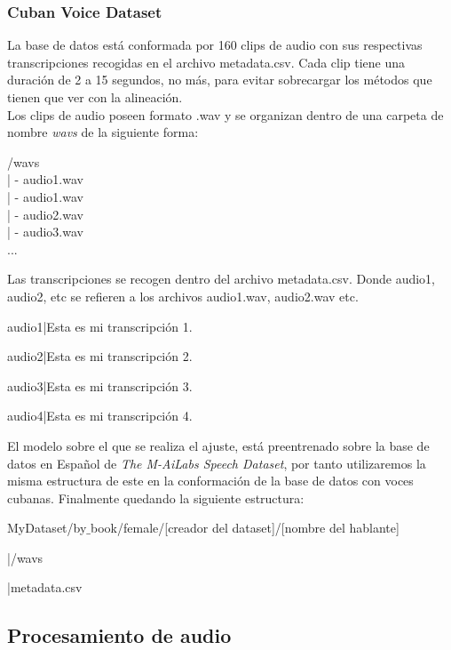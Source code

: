 \subsubsection{Cuban Voice Dataset}
La base de datos está conformada por 160 clips de audio con sus respectivas transcripciones recogidas en el archivo metadata.csv. Cada clip tiene una duración de 2 a 15 segundos, no más, para evitar sobrecargar los métodos que tienen que ver con la alineación.\\

Los clips de audio poseen formato .wav y se organizan dentro de una carpeta de nombre \textit{wavs} de la siguiente forma:

\begin{center}
	/wavs\\
	| - audio1.wav\\
	| - audio1.wav\\
	| - audio2.wav\\
	| - audio3.wav\\
	...
\end{center}

Las transcripciones se recogen dentro del archivo metadata.csv. Donde audio1, audio2, etc se refieren a los archivos audio1.wav, audio2.wav etc.

\begin{center}
	audio1|Esta es mi transcripción 1.
	
	audio2|Esta es mi transcripción 2.
	
	audio3|Esta es mi transcripción 3.
	
	audio4|Esta es mi transcripción 4.
\end{center}

El modelo sobre el que se realiza el ajuste, está preentrenado sobre la base de datos en Español de \textit{The M-AiLabs Speech Dataset}, por tanto utilizaremos la misma estructura de este en la conformación de la base de datos con voces cubanas. Finalmente quedando la siguiente estructura:

\begin{flushleft}
	MyDataset/by$\_$book/female/[creador del dataset]/[nombre del hablante]
	
	|/wavs
	
	|metadata.csv
\end{flushleft}






\subsection{Procesamiento de audio}

